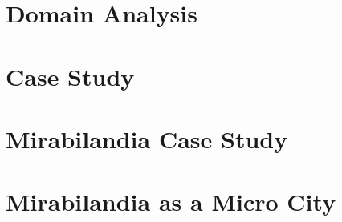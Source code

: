 \documentclass{report}
\begin{document}
\maketitle
\tableofcontents
\clearpage

\chapter{Domain Analysis}\label{chap:domain-analysis}






\chapter{Case Study}\label{chap:case-study}






\chapter{Mirabilandia Case Study}\label{chap:mira-case-study}



\chapter{Mirabilandia as a Micro City}\label{chap:mira-micro-city}


\nocite{*}
\newpage
\printbibliography[heading=bibintoc]
\end{document}
